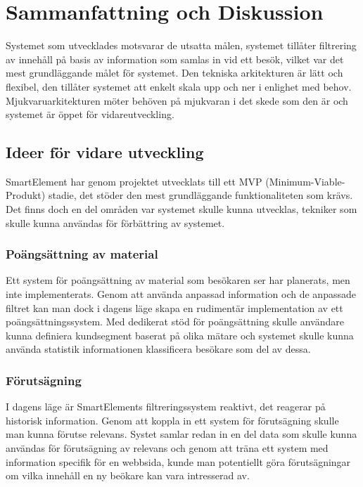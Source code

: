 \section{Sammanfattning och Diskussion}

Systemet som utvecklades motsvarar de utsatta målen, systemet tillåter filtrering av innehåll på basis av information som samlas in vid ett besök, vilket var det mest grundläggande målet för systemet. Den tekniska arkitekturen är  lätt och flexibel, den tillåter systemet att enkelt skala upp och ner i enlighet med behov. Mjukvaruarkitekturen möter behöven på mjukvaran i det skede som den är och systemet är öppet för vidareutveckling.

\subsection{Ideer för vidare utveckling}

SmartElement har genom projektet utvecklats till ett MVP (Minimum-Viable-Produkt) stadie, det stöder den mest grundläggande funktionaliteten som krävs. Det finns doch en del områden var systemet skulle kunna utvecklas, tekniker som skulle kunna användas för förbättring av systemet.

\subsubsection{Poängsättning av material}

Ett system för poängsättning av material som besökaren ser har planerats, men inte implementerats. Genom att använda anpassad information och de anpassade filtret kan man dock i dagens läge skapa en rudimentär implementation av ett poängsättningssystem. Med dedikerat stöd för poängsättning skulle användare kunna definiera kundsegment baserat på olika mätare och systemet skulle kunna använda statistik informationen klassificera besökare som del av dessa.

\subsubsection{Förutsägning}

I dagens läge är SmartElements filtreringssystem reaktivt, det reagerar på historisk information. Genom att koppla in ett system för förutsägning skulle man kunna förutse relevans. Systet samlar redan in en del data som skulle kunna användas för förutsägning av relevans och genom att träna ett system med information specifik för en webbsida, kunde man potentiellt göra förutsägningar om vilka innehåll en ny beökare kan vara intresserad av.


